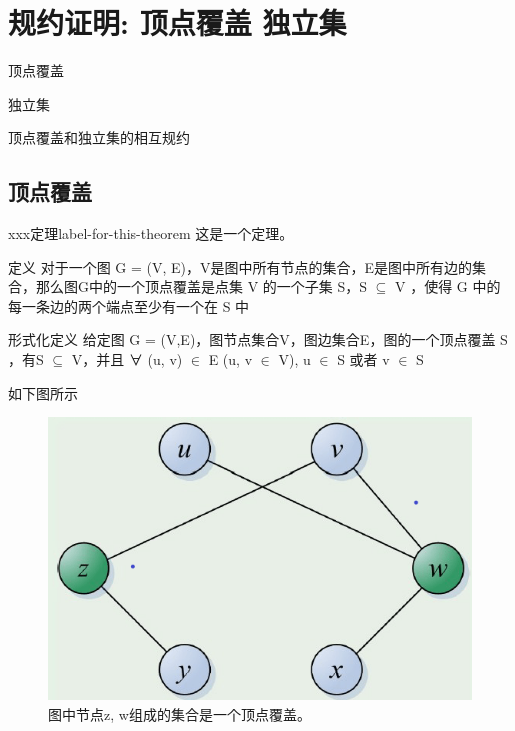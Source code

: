 \chapter{规约证明: 顶点覆盖  独立集}

\begin{introduction}
	\item 顶点覆盖
	\item 独立集
	\item 顶点覆盖和独立集的相互规约
\end{introduction}


\section{顶点覆盖}

\begin{theorem}{xxx定理}{label-for-this-theorem}
	这是一个定理。
\end{theorem}


\begin{definition}{定义}
	对于一个图 G = (V, E)，V是图中所有节点的集合，E是图中所有边的集合，那么图G中的一个顶点覆盖是点集 V 的一个子集 S，S $ \subseteq $ V ，使得 G 中的每一条边的两个端点至少有一个在 S 中
\end{definition}

\begin{definition}{形式化定义}
    给定图 G = (V,E)，图节点集合V，图边集合E，图的一个顶点覆盖 S ，有S $ \subseteq $ V，并且 ∀ (u, v) $ \in $ E (u, v $ \in $ V), u $ \in $ S 或者 v $ \in $ S
\end{definition}

\begin{example}
    如下图所示
	\begin{figure}[hbt]
        \centering
        \includegraphics{image/Proof-of-Statute1.png}
        \caption{图中节点z, w组成的集合是一个顶点覆盖。}\label{fig:example}
    \end{figure}
\end{example}

